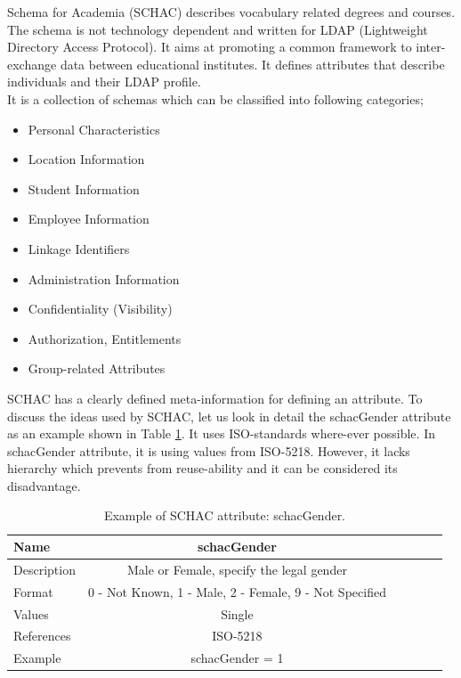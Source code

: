 \documentclass[12pt,a4paper,oneside]{book}
\begin{document}
    Schema for Academia (SCHAC) describes vocabulary related degrees and courses. The schema is not technology dependent and written for LDAP (Lightweight Directory Access Protocol). It aims at promoting a common framework to inter-exchange data between educational institutes. It defines attributes that describe individuals and their LDAP profile. \\
    
	It is a collection of schemas which can be classified into following categories;
\begin{itemize}
\item
Personal Characteristics
\item
Location Information
\item
Student Information
\item
Employee Information
\item
Linkage Identifiers
\item
Administration Information
\item
Confidentiality (Visibility)
\item
Authorization, Entitlements
\item
Group-related Attributes
\end{itemize}

	SCHAC has a clearly defined meta-information for defining an attribute. To discuss the ideas  used by SCHAC, let us look in detail the schacGender attribute as an example shown in Table \ref{tab:schacGender}. It uses ISO-standards where-ever possible. In schacGender attribute, it is using values from ISO-5218. However, it lacks hierarchy which prevents from reuse-ability and it can be considered its disadvantage. \\
	
\begin{table}[!tbh]
\caption{Example of SCHAC attribute: schacGender.}
\label{tab:schacGender}
\centering
\begin{tabular}[width=\columnwidth]{|p{1.3in}|c|c|c|c|c|}
\hline
Name               	& schacGender \\
\hline
Description 	    & Male or Female, specify the legal gender	\\
Format	    		& 0 - Not Known, 1 - Male, 2 - Female, 9 - Not Specified \\
Values				& Single \\
References	        & ISO-5218	\\
Example	            & schacGender = 1	\\
\hline
\end{tabular}
\end{table}
\end{document}
